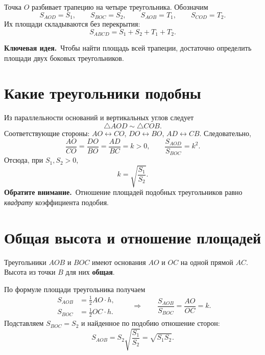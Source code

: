 \documentclass[a4paper,12pt]{article}
\newcommand{\idea}[1]{\textcolor{darkaccent}{\textbf{Ключевая идея.}}~#1}
\newcommand{\warn}[1]{\textcolor{accent}{\textbf{Обратите внимание.}}~#1}
\newcommand{\SA}{S_{AOD}}
\newcommand{\SB}{S_{BOC}}
\newcommand{\ST}{S_{ABCD}}
\begin{document}
Точка $O$ разбивает трапецию на четыре треугольника. Обозначим
\[
\SA=S_1,\qquad \SB=S_2,\qquad S_{AOB}=T_1,\qquad S_{COD}=T_2.
\]
Их площади складываются без перекрытия:
\[
\boxed{\ST=S_1+S_2+T_1+T_2.}
\]

\idea{Чтобы найти площадь всей трапеции, достаточно определить площади двух боковых треугольников.}

\section{Какие треугольники подобны}
Из параллельности оснований и вертикальных углов следует
\[
\triangle AOD\sim\triangle COB.
\]
Соответствующие стороны: $AO\leftrightarrow CO$, $DO\leftrightarrow BO$, $AD\leftrightarrow CB$. Следовательно,
\[
\frac{AO}{CO}=\frac{DO}{BO}=\frac{AD}{BC}=k>0,
\qquad \frac{\SA}{\SB}=k^2.
\]
Отсюда, при $S_1,S_2>0$,
\[
\boxed{k=\sqrt{\frac{S_1}{S_2}}.}
\]
\warn{Отношение площадей подобных треугольников равно \emph{квадрату} коэффициента подобия.}
\clearpage

\section{Общая высота и отношение площадей}
Треугольники $AOB$ и $BOC$ имеют основания $AO$ и $OC$ на одной прямой $AC$. Высота из точки $B$ для них \textbf{общая}.

\begin{center}
\end{center}

По формуле площади треугольника получаем
\[
\begin{aligned}
S_{AOB}&=\frac12 AO\cdot h,\\
S_{BOC}&=\frac12 OC\cdot h.
\end{aligned}
\qquad\Longrightarrow\qquad
\frac{S_{AOB}}{S_{BOC}}=\frac{AO}{OC}=k.
\]
Подставляем $S_{BOC}=S_2$ и найденное по подобию отношение сторон:
\[
S_{AOB}=S_2\sqrt{\frac{S_1}{S_2}}
=\boxed{\sqrt{S_1S_2}}.
\]
\end{document}
